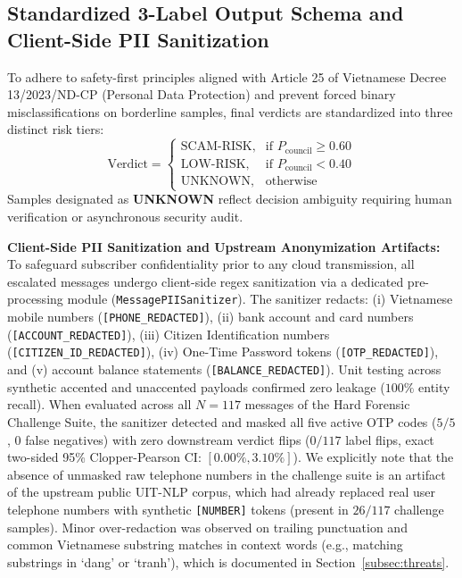 \documentclass[journal]{IEEEtran}
\begin{document}
\subsection{Standardized 3-Label Output Schema and Client-Side PII Sanitization}
\label{subsec:privacy}

To adhere to safety-first principles aligned with Article 25 of Vietnamese Decree 13/2023/ND-CP (Personal Data Protection) and prevent forced binary misclassifications on borderline samples, final verdicts are standardized into three distinct risk tiers:
\begin{equation}
\label{eq:labels}
\text{Verdict} = \begin{cases} 
\text{SCAM-RISK}, & \text{if } P_{\text{council}} \ge 0.60 \\
\text{LOW-RISK}, & \text{if } P_{\text{council}} < 0.40 \\
\text{UNKNOWN}, & \text{otherwise}
\end{cases}
\end{equation}
Samples designated as \textbf{UNKNOWN} reflect decision ambiguity requiring human verification or asynchronous security audit.

\textbf{Client-Side PII Sanitization and Upstream Anonymization Artifacts:} To safeguard subscriber confidentiality prior to any cloud transmission, all escalated messages undergo client-side regex sanitization via a dedicated pre-processing module (\texttt{MessagePIISanitizer}). The sanitizer redacts: (i) Vietnamese mobile numbers (\texttt{[PHONE\_REDACTED]}), (ii) bank account and card numbers (\texttt{[ACCOUNT\_REDACTED]}), (iii) Citizen Identification numbers (\texttt{[CITIZEN\_ID\_REDACTED]}), (iv) One-Time Password tokens (\texttt{[OTP\_REDACTED]}), and (v) account balance statements (\texttt{[BALANCE\_REDACTED]}). Unit testing across synthetic accented and unaccented payloads confirmed zero leakage ($100\%$ entity recall). When evaluated across all $N=117$ messages of the Hard Forensic Challenge Suite, the sanitizer detected and masked all five active OTP codes ($5/5$, $0$ false negatives) with zero downstream verdict flips ($0/117$ label flips, exact two-sided 95\% Clopper-Pearson CI: $[0.00\%, 3.10\%]$). We explicitly note that the absence of unmasked raw telephone numbers in the challenge suite is an artifact of the upstream public UIT-NLP corpus, which had already replaced real user telephone numbers with synthetic \texttt{[NUMBER]} tokens (present in $26/117$ challenge samples). Minor over-redaction was observed on trailing punctuation and common Vietnamese substring matches in context words (e.g., matching substrings in `dang' or `tranh'), which is documented in Section~\ref{subsec:threats}.
\end{document}
